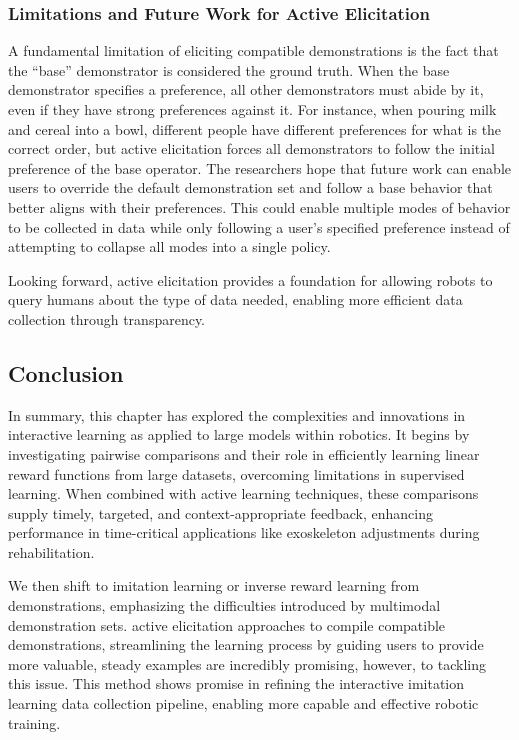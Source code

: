 \documentclass[
  letterpaper,
  numbers=noenddot,
  DIV=11]{scrreprt}
\theoremstyle{plain}
\theoremstyle{definition}
\theoremstyle{plain}
\theoremstyle{remark}
\begin{document}
\subsubsection*{Limitations and Future Work for Active
Elicitation}\label{limitations-and-future-work-for-active-elicitation}

A fundamental limitation of eliciting compatible demonstrations is the
fact that the ``base'' demonstrator is considered the ground truth. When
the base demonstrator specifies a preference, all other demonstrators
must abide by it, even if they have strong preferences against it. For
instance, when pouring milk and cereal into a bowl, different people
have different preferences for what is the correct order, but active
elicitation forces all demonstrators to follow the initial preference of
the base operator. The researchers hope that future work can enable
users to override the default demonstration set and follow a base
behavior that better aligns with their preferences. This could enable
multiple modes of behavior to be collected in data while only following
a user's specified preference instead of attempting to collapse all
modes into a single policy.

Looking forward, active elicitation provides a foundation for allowing
robots to query humans about the type of data needed, enabling more
efficient data collection through transparency.

\subsection{Conclusion}\label{conclusion-1}

In summary, this chapter has explored the complexities and innovations
in interactive learning as applied to large models within robotics. It
begins by investigating pairwise comparisons and their role in
efficiently learning linear reward functions from large datasets,
overcoming limitations in supervised learning. When combined with active
learning techniques, these comparisons supply timely, targeted, and
context-appropriate feedback, enhancing performance in time-critical
applications like exoskeleton adjustments during rehabilitation.

We then shift to imitation learning or inverse reward learning from
demonstrations, emphasizing the difficulties introduced by multimodal
demonstration sets. active elicitation approaches to compile compatible
demonstrations, streamlining the learning process by guiding users to
provide more valuable, steady examples are incredibly promising,
however, to tackling this issue. This method shows promise in refining
the interactive imitation learning data collection pipeline, enabling
more capable and effective robotic training.
\end{document}
